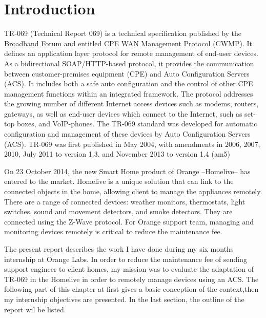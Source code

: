 
\chapter{Introduction} %

\label{Chapter1} %



TR-069 (Technical Report 069) is a technical specification published by the \href{https://www.broadband-forum.org/}{Broadband Forum} and entitled CPE WAN Management Protocol (CWMP)\cite{tr069}. It defines an application layer protocol for remote management of end-user devices. As a bidirectional SOAP/HTTP-based protocol, it provides the communication between customer-premises equipment (CPE) and Auto Configuration Servers (ACS). It includes both a safe auto configuration and the control of other CPE management functions within an integrated framework. The protocol addresses the growing number of different Internet access devices such as modems, routers, gateways, as well as end-user devices which connect to the Internet, such as set-top boxes, and VoIP-phones. The TR-069 standard was developed for automatic configuration and management of these devices by Auto Configuration Servers (ACS). TR-069 was first published in May 2004, with amendments in 2006, 2007, 2010, July 2011 to version 1.3. and November 2013 to version 1.4 (am5)

On 23 October 2014, the new Smart Home product of Orange --Homelive-- has entered to the market. Homelive is a unique solution that can link to the connected objects in the home, allowing client to manage the appliances remotely. There are a range of connected devices: weather monitors, thermostats, light switches, sound and movement detectors, and smoke detectors. They are connected using the Z-Wave protocol. For Orange support team, managing and monitoring devices remotely is critical to reduce the maintenance fee.

The present report describes the work I have done during my six months internship at Orange Labs. In order to reduce the maintenance fee of sending support engineer to client homes, my mission was to evaluate the adaptation of TR-069 in the Homelive in order to remotely manage devices using an ACS. The following part of this chapter at first gives a basic conception of the context,then my internship objectives are presented. In the last section, the outline of the report wil be listed.


